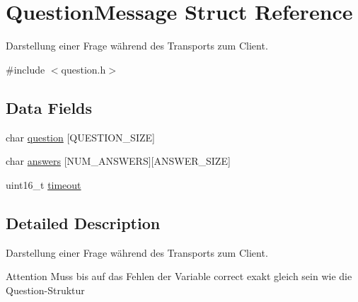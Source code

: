 \hypertarget{struct_question_message}{
\section{QuestionMessage Struct Reference}
\label{struct_question_message}
}


Darstellung einer Frage während des Transports zum Client.  




{\ttfamily \#include $<$question.h$>$}

\subsection*{Data Fields}
\begin{DoxyCompactItemize}
\item 
char \hyperlink{struct_question_message_a4b07688ced7937f6eb270f34c6870281}{question} \mbox{[}QUESTION\_\-SIZE\mbox{]}
\item 
char \hyperlink{struct_question_message_aee7134a1e311755686d480c3f8b963c7}{answers} \mbox{[}NUM\_\-ANSWERS\mbox{]}\mbox{[}ANSWER\_\-SIZE\mbox{]}
\item 
uint16\_\-t \hyperlink{struct_question_message_a7f1ad43d3bf79b40bc39dbb5a6c3a5ae}{timeout}
\end{DoxyCompactItemize}


\subsection{Detailed Description}
Darstellung einer Frage während des Transports zum Client. \begin{DoxyAttention}{Attention}
Muss bis auf das Fehlen der Variable correct exakt gleich sein wie die Question-\/Struktur 
\end{DoxyAttention}


